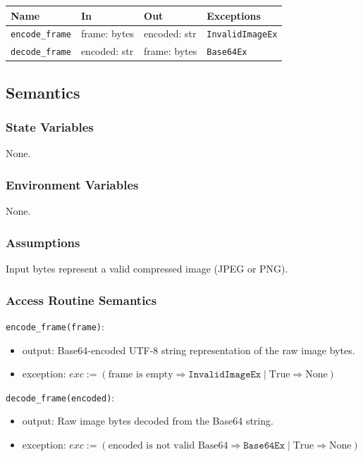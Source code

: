 \documentclass[12pt, titlepage]{article}
\begin{document}
\begin{center}
\begin{tabular}{p{3.5cm} p{4cm} p{3.5cm} p{3cm}}
\hline
\textbf{Name} & \textbf{In} & \textbf{Out} & \textbf{Exceptions} \\
\hline
\texttt{encode\_frame} & frame: bytes & encoded: str & \texttt{InvalidImageEx}\\
\texttt{decode\_frame} & encoded: str & frame: bytes & \texttt{Base64Ex}\\
\hline
\end{tabular}
\end{center}

\subsection{Semantics}

\subsubsection{State Variables}
None.

\subsubsection{Environment Variables}
None.

\subsubsection{Assumptions}
Input bytes represent a valid compressed image (JPEG or PNG).

\subsubsection{Access Routine Semantics}

\noindent \texttt{encode\_frame(frame)}:
\begin{itemize}
  \item output: Base64-encoded UTF-8 string representation of the raw image bytes.
  \item exception: $exc := (\text{frame is empty} \Rightarrow \texttt{InvalidImageEx} \mid \text{True} \Rightarrow \text{None})$
\end{itemize}

\noindent \texttt{decode\_frame(encoded)}:
\begin{itemize}
  \item output: Raw image bytes decoded from the Base64 string.
  \item exception: $exc := (\text{encoded is not valid Base64} \Rightarrow \texttt{Base64Ex} \mid \text{True} \Rightarrow \text{None})$
\end{itemize}
\end{document}
